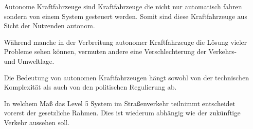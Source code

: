 Autonome Kraftfahrzeuge sind Kraftfahrzeuge die nicht nur automatisch fahren sondern von einem System gesteuert werden.
Somit sind diese Kraftfahrzeuge aus Sicht der Nutzenden autonom.

Während manche in der Verbreitung autonomer Kraftfahrzeuge die Lösung vieler Probleme sehen können,
vermuten andere eine Verschlechterung der Verkehrs- und Umweltlage.

Die Bedeutung von autonomen Kraftfahrzeugen hängt sowohl von der technischen Komplexität als auch von den politischen Regulierung ab.

In welchem Maß das Level 5 System im Straßenverkehr teilnimmt entscheidet vorerst der gesetzliche Rahmen.
Dies ist wiederum abhängig wie der zukünftige Verkehr aussehen soll.